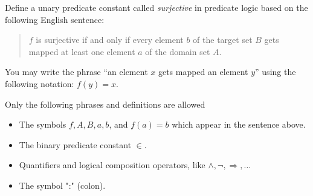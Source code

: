 \documentclass[a4paper,11pt]{exam}
\theoremstyle{definition}
\begin{document}
\begin{questions}
Define a unary predicate constant called {\em surjective} in predicate logic based on the following English sentence:
\begin{quote}
$f$ is surjective if and only if every element $b$ of the target set $B$ gets mapped at least one element $a$ of the domain set $A$.
\end{quote}
You may write the phrase ``an element $x$ gets mapped an element $y$'' using the following notation: $f(y) = x$.

Only the following phrases and definitions are allowed
\begin{itemize}
	\item The symbols $f, A, B, a, b$, and $f(a) = b$ which appear in the sentence above.
	\item The binary predicate constant $\in$.
	\item Quantifiers and logical composition operators, like $\land, \lnot, \Rightarrow, \ldots$
	\item The symbol ":" (colon).
\end{itemize}


\end{questions}
\end{document}
